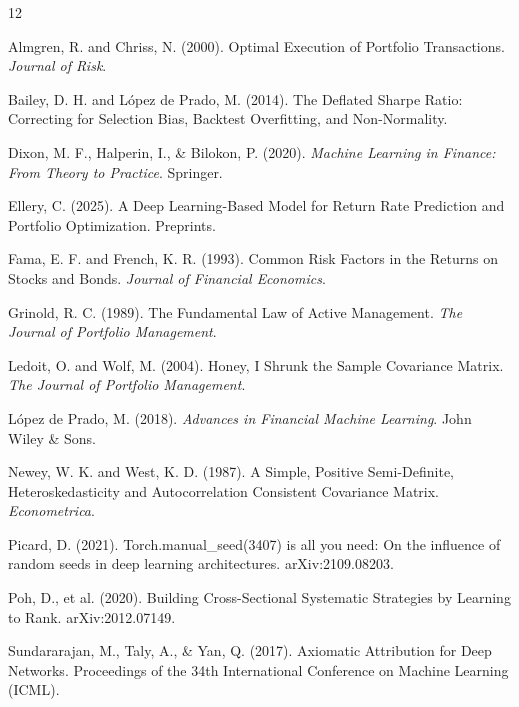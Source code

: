 \documentclass[twoside,final]{hcmut-report}
\begin{document}

\begin{thebibliography}{12}

    Almgren, R. and Chriss, N. (2000).
    Optimal Execution of Portfolio Transactions.
    \emph{Journal of Risk}.

    Bailey, D. H. and López de Prado, M. (2014).
    The Deflated Sharpe Ratio: Correcting for Selection Bias, Backtest Overfitting, and Non-Normality.

    Dixon, M. F., Halperin, I., \& Bilokon, P. (2020).
    \emph{Machine Learning in Finance: From Theory to Practice}.
    Springer.

    Ellery, C. (2025).
    A Deep Learning-Based Model for Return Rate Prediction and Portfolio Optimization.
    Preprints.

    Fama, E. F. and French, K. R. (1993).
    Common Risk Factors in the Returns on Stocks and Bonds.
    \emph{Journal of Financial Economics}.

    Grinold, R. C. (1989).
    The Fundamental Law of Active Management.
    \emph{The Journal of Portfolio Management}.

    Ledoit, O. and Wolf, M. (2004).
    Honey, I Shrunk the Sample Covariance Matrix.
    \emph{The Journal of Portfolio Management}.

    López de Prado, M. (2018).
    \emph{Advances in Financial Machine Learning}.
    John Wiley \& Sons.

    Newey, W. K. and West, K. D. (1987).
    A Simple, Positive Semi-Definite, Heteroskedasticity and Autocorrelation Consistent Covariance Matrix.
    \emph{Econometrica}.

    Picard, D. (2021).
    Torch.manual\_seed(3407) is all you need: On the influence of random seeds in deep learning architectures.
    arXiv:2109.08203.

    Poh, D., et al. (2020).
    Building Cross-Sectional Systematic Strategies by Learning to Rank.
    arXiv:2012.07149.

    Sundararajan, M., Taly, A., \& Yan, Q. (2017).
    Axiomatic Attribution for Deep Networks.
    Proceedings of the 34th International Conference on Machine Learning (ICML).

\end{thebibliography}
\end{document}
